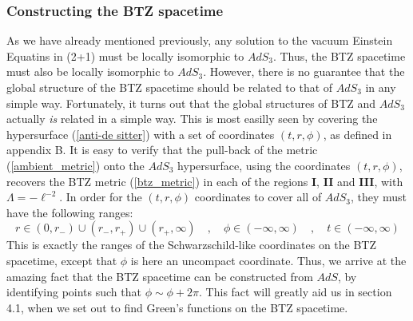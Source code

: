 \subsubsection{Constructing the BTZ spacetime}
As we have already mentioned previously, any solution to the vacuum Einstein Equatins in (2+1) must be locally isomorphic to $AdS_3$. Thus, the BTZ spacetime must also be locally isomorphic to $AdS_3$. However, there is no guarantee that the global structure of the BTZ spacetime should be related to that of $AdS_3$ in any simple way. Fortunately, it turns out that the global structures of BTZ and $AdS_3$ actually \textit{is} related in a simple way. This is most easilly seen by covering the hypersurface (\ref{anti-de sitter}) with a set of coordinates $(t, r, \phi)$, as defined in appendix B. It is easy to verify that the pull-back of the metric (\ref{ambient_metric}) onto the $AdS_3$ hypersurface, using the coordinates $(t, r, \phi)$, recovers the BTZ metric (\ref{btz_metric}) in each of the regions \textbf{I}, \textbf{II} and \textbf{III}, with $\Lambda = -\ell^{-2}$. In order for the $(t, r, \phi)$ coordinates to cover all of $AdS_3$, they must have the following ranges:
%
%
\begin{equation}
r \in (0, r_-) \cup (r_-, r_+) \cup (r_+, \infty)
\quad , \quad
\phi \in (-\infty, \infty)
\quad , \quad
t \in (-\infty, \infty)
\end{equation}
%
%
This is exactly the ranges of the  Schwarzschild-like coordinates on the BTZ spacetime, except that $\phi$ is here an uncompact coordinate. Thus, we arrive at the amazing fact that the BTZ spacetime can be constructed from $AdS$, by identifying points such that $\phi \sim \phi + 2 \pi$. This fact will greatly aid us in section 4.1, when we set out to find Green's functions on the BTZ spacetime.
